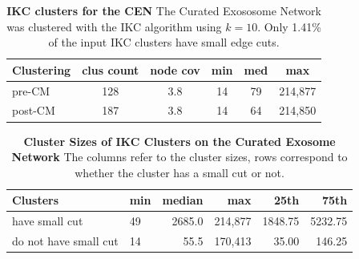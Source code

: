 \documentclass[11pt]{article}   	%
\begin{document}



\begin{table}[ht]
\centering
\begin{tabular}{lccccc}
  \hline
Clustering & clus count & node cov & min & med & max       \\ \hline
pre-CM       & 128         & 3.8       & 14  & 79  & 214,877 \\
post-CM & 187 & 3.8 & 14 & 64 & 214,850\\
  \hline
\end{tabular}
\caption[IKC clusters pre- and post-CM processing for the CEN]{\textbf{IKC clusters  for the CEN}
The Curated Exososome Network was clustered with the IKC algorithm using  $k=10$. 
Only 1.41\% of the input IKC clusters have small edge cuts.
}
\label{tab:IKC-11-CEN-basicstats}
\end{table}

\begin{table}[ht]
\centering
\begin{tabular}{llrrrr}
    \hline
      Clusters        & min & median & max    & 25th    & 75th    \\
    \hline
have small cut    & 49  & 2685.0  & 214,877 & 1848.75 & 5232.75 \\
do not have small cut & 14  & 55.5   & 170,413 & 35.00      & 146.25 \\
    \hline
\end{tabular}
\caption[Cluster Sizes of IKC Clusters on the CEN ]{\textbf{ Cluster Sizes of IKC Clusters on the Curated Exosome Network}  The columns refer to the  cluster sizes, rows correspond to whether the cluster has a small cut or not.}
\label{tab:IKC-CEN-sizes}
\end{table}
\end{document}
